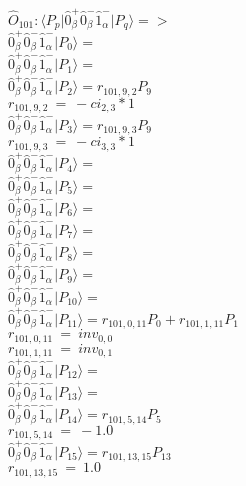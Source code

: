 \documentclass[14pt]{article}
\begin{document}
    $\hat{O}_{101}:  \langle{P_p}\vert \hat{0}_{\beta}^{+}\hat{0}_{\beta}^{-}\hat{1}_{\alpha}^{-} \vert{P_q}\rangle => $ \\ 
    $ \hat{0}_{\beta}^{+}\hat{0}_{\beta}^{-}\hat{1}_{\alpha}^{-} \vert{P_{0}}\rangle =  $ \\ 
    $ \hat{0}_{\beta}^{+}\hat{0}_{\beta}^{-}\hat{1}_{\alpha}^{-} \vert{P_{1}}\rangle =  $ \\ 
    $ \hat{0}_{\beta}^{+}\hat{0}_{\beta}^{-}\hat{1}_{\alpha}^{-} \vert{P_{2}}\rangle = {r}_{101,9,2}P_{9} $ \\ 
    ${r}_{101,9,2}\ =\ -{ci}_{2,3}*1 $ \\ 
    $ \hat{0}_{\beta}^{+}\hat{0}_{\beta}^{-}\hat{1}_{\alpha}^{-} \vert{P_{3}}\rangle = {r}_{101,9,3}P_{9} $ \\ 
    ${r}_{101,9,3}\ =\ -{ci}_{3,3}*1 $ \\ 
    $ \hat{0}_{\beta}^{+}\hat{0}_{\beta}^{-}\hat{1}_{\alpha}^{-} \vert{P_{4}}\rangle =  $ \\ 
    $ \hat{0}_{\beta}^{+}\hat{0}_{\beta}^{-}\hat{1}_{\alpha}^{-} \vert{P_{5}}\rangle =  $ \\ 
    $ \hat{0}_{\beta}^{+}\hat{0}_{\beta}^{-}\hat{1}_{\alpha}^{-} \vert{P_{6}}\rangle =  $ \\ 
    $ \hat{0}_{\beta}^{+}\hat{0}_{\beta}^{-}\hat{1}_{\alpha}^{-} \vert{P_{7}}\rangle =  $ \\ 
    $ \hat{0}_{\beta}^{+}\hat{0}_{\beta}^{-}\hat{1}_{\alpha}^{-} \vert{P_{8}}\rangle =  $ \\ 
    $ \hat{0}_{\beta}^{+}\hat{0}_{\beta}^{-}\hat{1}_{\alpha}^{-} \vert{P_{9}}\rangle =  $ \\ 
    $ \hat{0}_{\beta}^{+}\hat{0}_{\beta}^{-}\hat{1}_{\alpha}^{-} \vert{P_{10}}\rangle =  $ \\ 
    $ \hat{0}_{\beta}^{+}\hat{0}_{\beta}^{-}\hat{1}_{\alpha}^{-} \vert{P_{11}}\rangle = {r}_{101,0,11}P_{0}+{r}_{101,1,11}P_{1} $ \\ 
    ${r}_{101,0,11}\ =\ {inv}_{0,0} $ \\ 
    ${r}_{101,1,11}\ =\ {inv}_{0,1} $ \\ 
    $ \hat{0}_{\beta}^{+}\hat{0}_{\beta}^{-}\hat{1}_{\alpha}^{-} \vert{P_{12}}\rangle =  $ \\ 
    $ \hat{0}_{\beta}^{+}\hat{0}_{\beta}^{-}\hat{1}_{\alpha}^{-} \vert{P_{13}}\rangle =  $ \\ 
    $ \hat{0}_{\beta}^{+}\hat{0}_{\beta}^{-}\hat{1}_{\alpha}^{-} \vert{P_{14}}\rangle = {r}_{101,5,14}P_{5} $ \\ 
    ${r}_{101,5,14}\ =\ -1.0 $ \\ 
    $ \hat{0}_{\beta}^{+}\hat{0}_{\beta}^{-}\hat{1}_{\alpha}^{-} \vert{P_{15}}\rangle = {r}_{101,13,15}P_{13} $ \\ 
    ${r}_{101,13,15}\ =\ 1.0 $ \\ 
    
\end{document}
